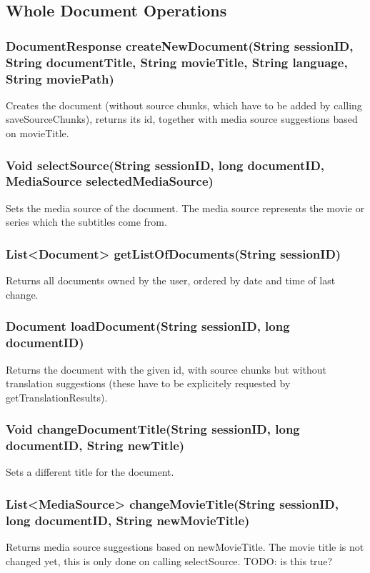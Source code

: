 \subsection{Whole Document Operations}

\subsubsection{DocumentResponse createNewDocument(String sessionID, String documentTitle, String movieTitle, String language, String moviePath)}

Creates the document
(without source chunks, which have to be added by calling saveSourceChunks),
returns its id, together with media source suggestions based on movieTitle.
     	
\subsubsection{Void selectSource(String sessionID, long documentID, MediaSource selectedMediaSource)}
Sets the media source of the document. The media source represents the movie or series which the subtitles come from.

\subsubsection{List<Document> getListOfDocuments(String sessionID)}
Returns all documents owned by the user, ordered by date and time of last change.

\subsubsection{Document loadDocument(String sessionID, long documentID)}
Returns the document with the given id, with source chunks but without translation suggestions (these have to be explicitely requested by getTranslationResults).

\subsubsection{Void changeDocumentTitle(String sessionID, long documentID, String newTitle)}
Sets a different title for the document.

\subsubsection{List<MediaSource> changeMovieTitle(String sessionID, long documentID, String newMovieTitle)}
Returns media source suggestions based on newMovieTitle.
The movie title is not changed yet,
this is only done on calling selectSource.
TODO: is this true?     	 
     	
